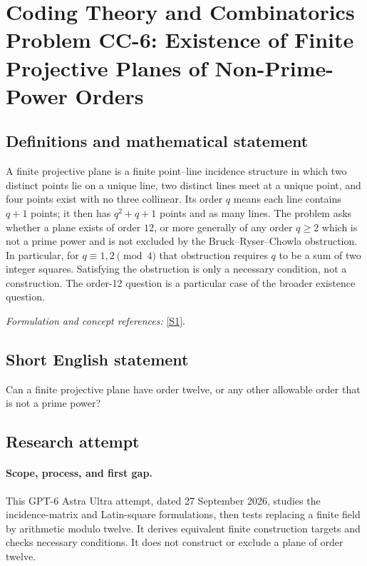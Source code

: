 \documentclass[11pt]{article}
\begin{document}
\section*{\texorpdfstring{Coding Theory and Combinatorics Problem CC-6: Existence of Finite Projective Planes of Non-Prime-Power Orders}{Coding Theory and Combinatorics Problem CC-6: Existence of Finite Projective Planes of Non-Prime-Power Orders}}\label{statement}
\subsection{Definitions and mathematical statement}
A finite projective plane is a finite point--line incidence structure in which two distinct points lie on a unique line, two distinct lines meet at a unique point, and four points exist with no three collinear. Its order $q$ means each line contains $q+1$ points; it then has $q^2+q+1$ points and as many lines. The problem asks whether a plane exists of order $12$, or more generally of any order $q\ge2$ which is not a prime power and is not excluded by the Bruck--Ryser--Chowla obstruction. In particular, for $q\equiv1,2\pmod4$ that obstruction requires $q$ to be a sum of two integer squares. Satisfying the obstruction is only a necessary condition, not a construction. The order-12 question is a particular case of the broader existence question.
\par\smallskip\textit{Formulation and concept references:} \href{https://arxiv.org/pdf/0811.1254}{[S1]}.

\subsection{Short English statement}
Can a finite projective plane have order twelve, or any other allowable order that is not a prime power?
\subsection{Research attempt}
\paragraph{Scope, process, and first gap.}
This GPT-6 Astra Ultra attempt, dated 27 September 2026, studies the incidence-matrix and Latin-square formulations, then tests replacing a finite field by arithmetic modulo twelve. It derives equivalent finite construction targets and checks necessary conditions. It does not construct or exclude a plane of order twelve.
\end{document}
